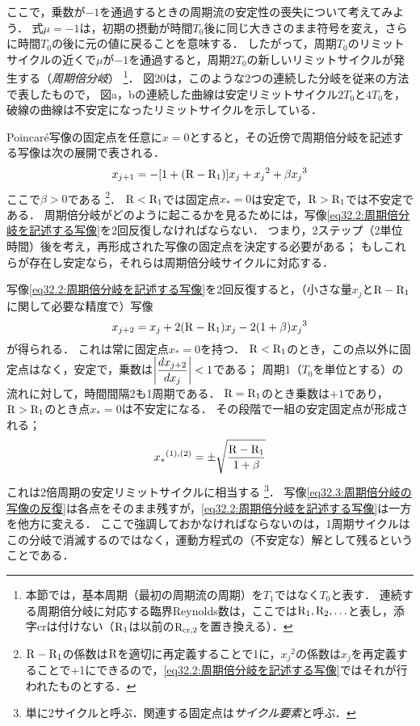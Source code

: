 ここで，乗数が$-1$を通過するときの周期流の安定性の喪失について考えてみよう．
式$\mu=-1$は，初期の摂動が時間$T_0$後に同じ大きさのまま符号を変え，さらに時間$T_0$の後に元の値に戻ることを意味する．
したがって，周期$T_0$のリミットサイクルの近くで$\mu$が$-1$を通過すると，周期$2T_0$の新しいリミットサイクルが発生する（\emph{周期倍分岐}）
\footnote{本節では，基本周期（最初の周期流の周期）を$T_1$ではなく$T_0$と表す．
連続する周期倍分岐に対応する臨界Reynolds数は，ここでは$\mathrm{R}_1, \mathrm{R}_2, \ldots$と表し，添字crは付けない（$\mathrm{R}_1$は以前の$\mathrm{R}_\mathrm{cr,2}$を置き換える）．}．
図20は，このような2つの連続した分岐を従来の方法で表したもので，
図a，bの連続した曲線は安定リミットサイクル$2T_0$と$4T_0$を，破線の曲線は不安定になったリミットサイクルを示している．



Poincar\'{e}写像の固定点を任意に$x=0$とすると，その近傍で周期倍分岐を記述する写像は次の展開で表される．
\begin{equation}\label{eq32.2:周期倍分岐を記述する写像}
    x_{j+1} = -[1+(\mathrm{R}-\mathrm{R}_1)]x_j + {x_j}^2 + \beta {x_j}^3
\end{equation}
ここで$\beta>0$である
\footnote{$\mathrm{R}-\mathrm{R}_1$の係数は$\mathrm{R}$を適切に再定義することで1に，${x_j}^2$の係数は$x_j$を再定義することで+1にできるので，\eqref{eq32.2:周期倍分岐を記述する写像}ではそれが行われたものとする．}．
$\mathrm{R}<\mathrm{R}_1$では固定点$x_*=0$は安定で，$\mathrm{R}>\mathrm{R}_1$では不安定である．
周期倍分岐がどのように起こるかを見るためには，写像\eqref{eq32.2:周期倍分岐を記述する写像}を2回反復しなければならない．
つまり，2ステップ（2単位時間）後を考え，再形成された写像の固定点を決定する必要がある；
もしこれらが存在し安定なら，それらは周期倍分岐サイクルに対応する．



写像\eqref{eq32.2:周期倍分岐を記述する写像}を2回反復すると，（小さな量$x_j$と$\mathrm{R}-\mathrm{R}_1$に関して必要な精度で）写像
\begin{equation}\label{eq32.3:周期倍分岐の写像の反復}
    x_{j+2} = x_j +2(\mathrm{R}-\mathrm{R}_1)x_j -2(1+\beta) {x_j}^3
\end{equation}
が得られる．
これは常に固定点$x_*=0$を持つ．
$\mathrm{R}<\mathrm{R}_1$のとき，この点以外に固定点はなく，安定で，乗数は$\abs{\ddv{x_{j+2}}{x_j}}<1$である；
周期1（$T_0$を単位とする）の流れに対して，時間間隔2も1周期である．
$\mathrm{R}=\mathrm{R}_1$のとき乗数は$+1$であり，$\mathrm{R}>\mathrm{R}_1$のとき点$x_*=0$は不安定になる．
その段階で一組の安定固定点が形成される；
\begin{equation}
    {x_*}^{(1),(2)} = \pm \sqrt{ \frac{\mathrm{R}-\mathrm{R}_1}{1+\beta} }
\end{equation}
これは2倍周期の安定リミットサイクルに相当する
\footnote{単に2サイクルと呼ぶ．関連する固定点は\emph{サイクル要素}と呼ぶ．}．
写像\eqref{eq32.3:周期倍分岐の写像の反復}は各点をそのまま残すが，\eqref{eq32.2:周期倍分岐を記述する写像}は一方を他方に変える．
ここで強調しておかなければならないのは，1周期サイクルはこの分岐で消滅するのではなく，運動方程式の（不安定な）解として残るということである．




